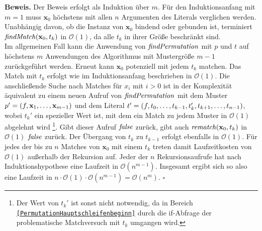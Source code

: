 \textbf{Beweis.}
Der Beweis erfolgt als Induktion über $m$.
Für den Induktionsanfang mit $m = 1$ muss $\mathbf x_0$ höchstens mit allen $n$ Argumenten des Literals verglichen werden. Unabhängig davon, ob die Instanz von $\mathbf x_0$ bindend oder gebunden ist, terminiert $\mathit{findMatch}(\mathbf x_0, t_k)$ in $\mathcal O(1)$, da alle $t_k$ in ihrer Größe beschränkt sind. \\
Im allgemeinen Fall kann die Anwendung von $\mathit{findPermutation}$ mit $p$ und $t$ auf höchstens $m$ Anwendungen des Algorithmus mit Mustergröße $m-1$ zurückgeführt werden. Erneut kann $\mathbf x_0$ potenziell mit jedem $t_k$ matchen. Das Match mit $t_k$ erfolgt wie im Induktionsanfang beschrieben in $\mathcal O (1)$. Die anschließende Suche nach Matches für $x_i$ mit $i > 0$ ist in der Komplexität äquivalent zu einem neuen Aufruf von $\mathit{findPermutation}$ mit dem Muster $p' = (f, {\mathbf x}_{1}, \dots, {\mathbf x}_{m-1})$ und dem Literal $t' = (f, {t}_{0}, \dots, {t}_{k-1}, t_k', {t}_{k+1}, \dots, {t}_{n-1})$, wobei $t_k'$ ein spezieller Wert ist, mit dem ein Match zu jedem Muster in $\mathcal O (1)$ abgelehnt wird \footnote{Der Wert von $t_k'$ ist sonst nicht notwendig, da in Bereich \texttt{\ref{PermutationHauptschleifenbeginn}} durch die if-Abfrage der problematische Matchversuch mit $t_k$ umgangen wird.}. Gibt dieser Aufruf $\mathit{false}$ zurück, gibt auch $\mathit{rematch}(\mathbf x_0, t_k)$ in $\mathcal O (1)$ $\mathit{false}$ zurück. Der Übergang von $t_k$ zu $t_{k-1}$ erfolgt ebenfalls in $\mathcal O (1)$. Für jedes der bis zu $n$ Matches von $\mathbf x_0$ mit einem $t_k$ treten damit Laufzeitkosten von $\mathcal O (1)$ außerhalb der Rekursion auf. Jeder der $n$ Rekursionsaufrufe hat nach Induktionshypothese eine Laufzeit in $\mathcal O (n^{m-1})$. Insgesamt ergibt sich so also eine Laufzeit in $n \cdot \mathcal O (1) \cdot \mathcal O (n^{m-1}) = \mathcal O (n^m)$.
\hfill $\square$\\


